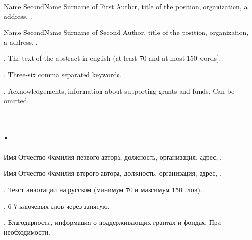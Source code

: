 	
\begin{abstr}
	Name SecondName Surname of First Author, title of the position, organization, a address, %
	. 
	\par 
	Name SecondName Surname of Second Author, title of the position, organization, a address, %
	. 
	\par
	{\normalfont \abstractnameENG.} The text of the abstract in english (at least 70 and at most 150 words).
	\par
	{\normalfont \keywordsENG.} Three-six comma separated keywords.
	\par
	{\normalfont \acknowledgementsENG.} Acknowledgements, information about supporting grants and funds. Can be omitted. 
	\delnewpagebeforech %


	\chapter*{\normalsize\thechapter. \chapterRuTitle} %
	
	Имя Отчество Фамилия первого автора, должность, организация, адрес, . %
	\par
	Имя Отчество Фамилия второго автора, должность, организация, адрес, . %
	\par
	{\normalfont \abstractname.} Текст аннотации на русском (минимум 70 и максимум 150 слов).   
	\par
	{\normalfont \keywords.} 6-7 ключевых слов через запятую.
	\par
	{\normalfont \acknowledgements.} Благодарности, информация о поддерживающих грантах и фондах. При необходимости. 


\end{abstr}

